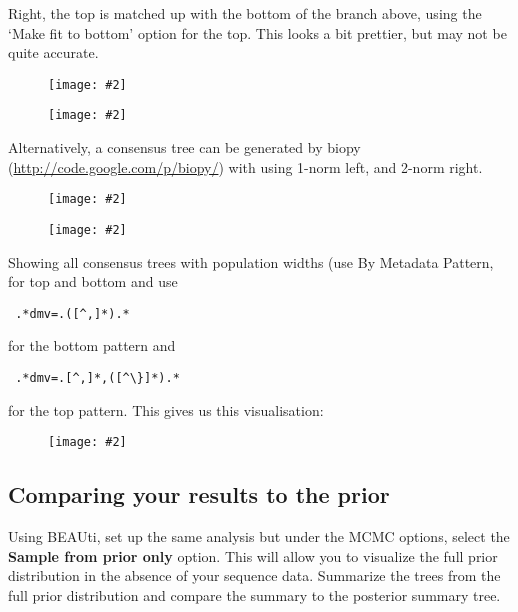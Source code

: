 \documentclass{article}
\newcommand{\includeimage}[2][]{%
\texttt{[image: \#2]}
}
\begin{document}
Right, the top is matched up with the bottom of the branch above, using the `Make fit to bottom'
option for the top. This looks a bit prettier, but may not be quite accurate.

\begin{figure}
\centering
\includeimage[scale=0.18]{figures/species_population1}
\end{figure}
\begin{figure}
\centering
\includeimage[scale=0.18]{figures/species_population2}
\end{figure}

Alternatively, a consensus tree can be generated by biopy (\url{http://code.google.com/p/biopy/})
with using 1-norm left, and 2-norm right.

\begin{figure}
\centering
\includeimage[scale=0.18]{figures/species_population4}
\end{figure}
\begin{figure}
\centering
\includeimage[scale=0.18]{figures/species_population5}
\end{figure}

Showing all consensus trees with population widths
(use By Metadata Pattern, for top and bottom and use {\begin{verbatim} .*dmv=.([^,]*).*\end{verbatim}} 
for the bottom pattern and {\begin{verbatim} .*dmv=.[^,]*,([^\}]*).*\end{verbatim}} for the top pattern.
This gives us this visualisation:

\begin{figure}
\centering
\includeimage[scale=0.25]{figures/species_population3}
\end{figure}


\subsection*{Comparing your results to the prior}

Using BEAUti, set up the same analysis but under the MCMC options, select the {\bf Sample from prior only} option. This will allow you to visualize the full prior distribution in the absence of your sequence data. Summarize the trees from the full prior
distribution and compare the summary to the posterior summary tree.




\end{document}
